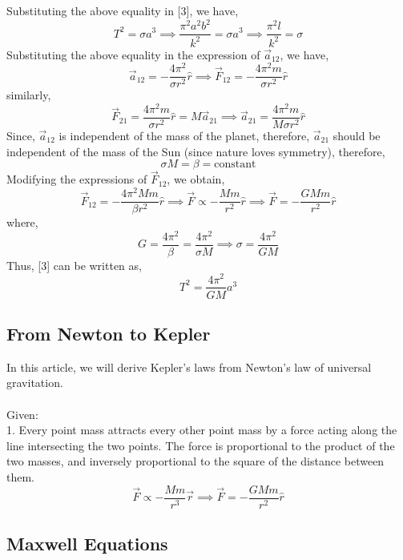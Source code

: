 \documentclass[12pt]{article}
\begin{document}
Substituting the above equality in [3], we have,
$$T^2=\sigma a^3 \implies \frac{\pi^2 a^2b^2}{k^2}=\sigma a^3 \implies \frac{\pi^2 l}{k^2}=\sigma$$
Substituting the above equality in the expression of $\vec a_{12}$, we have,
$$\vec a_{12} = -\frac{4\pi^2}{\sigma r^2}\hat r \implies \vec F_{12} = -\frac{4\pi^2m}{\sigma r^2}\hat r$$
similarly,
$$\vec F_{21} = \frac{4\pi^2m}{\sigma r^2}\hat r = M\vec a_{21} \implies \vec a_{21} = \frac{4\pi^2m}{M\sigma r^2}\hat r $$
Since, $\vec a_{12}$ is independent of the mass of the planet, therefore, $\vec a_{21}$ should be independent of the mass of the Sun (since nature loves symmetry), therefore,
$$\sigma M  = \beta = \text{constant}$$
Modifying the expressions of $\vec F_{12}$, we obtain,
$$\vec F_{12} = -\frac{4\pi^2Mm}{\beta r^2}\hat r \implies \vec F \propto -\frac{Mm}{r^2}\hat r \implies \vec F = -\frac{GMm}{r^2}\hat r$$
where,
$$G=\frac{4\pi^2}{\beta}=\frac{4\pi^2}{\sigma M} \implies \sigma=\frac{4\pi^2}{GM}$$
Thus, [3] can be written as,
$$T^2=\frac{4\pi^2}{GM}a^3$$


\subsection{From Newton to Kepler}
In this article, we will derive Kepler's laws from Newton's law of universal gravitation.\\ \\
Given:\\
1. Every point mass attracts every other point mass by a force acting along the line intersecting the two points. The force is proportional to the product of the two masses, and inversely proportional to the square of the distance between them.
$$\vec F \propto -\frac{Mm}{r^3}\vec r \implies \vec F = -\frac{GMm}{r^2}\hat r $$


\subsection{Maxwell Equations}
\end{document}
